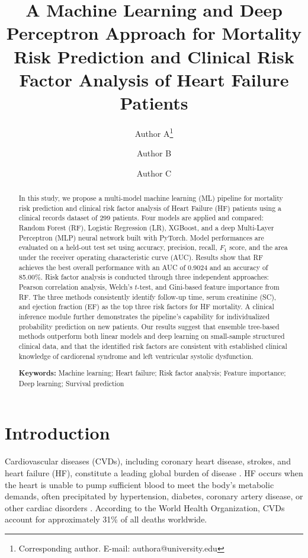 \documentclass[12pt,a4paper]{article}
\title{\textbf{A Machine Learning and Deep Perceptron Approach for Mortality Risk Prediction and Clinical Risk Factor Analysis of Heart Failure Patients}}
\author[1]{Author A\thanks{Corresponding author. E-mail: authora@university.edu}}
\author[1]{Author B}
\author[2]{Author C}
\affil[1]{Department of Computer Science, University A, City, Country}
\affil[2]{Department of Cardiology, University B, City, Country}
\date{}
\begin{document}
\maketitle

\begin{abstract}
\noindent
In this study, we propose a multi-model machine learning (ML) pipeline for mortality risk prediction and clinical risk factor analysis of Heart Failure (HF) patients using a clinical records dataset of 299 patients. Four models are applied and compared: Random Forest (RF), Logistic Regression (LR), XGBoost, and a deep Multi-Layer Perceptron (MLP) neural network built with PyTorch. Model performances are evaluated on a held-out test set using accuracy, precision, recall, $F_1$ score, and the area under the receiver operating characteristic curve (AUC). Results show that RF achieves the best overall performance with an AUC of 0.9024 and an accuracy of 85.00\%. Risk factor analysis is conducted through three independent approaches: Pearson correlation analysis, Welch's $t$-test, and Gini-based feature importance from RF. The three methods consistently identify follow-up time, serum creatinine (SC), and ejection fraction (EF) as the top three risk factors for HF mortality. A clinical inference module further demonstrates the pipeline's capability for individualized probability prediction on new patients. Our results suggest that ensemble tree-based methods outperform both linear models and deep learning on small-sample structured clinical data, and that the identified risk factors are consistent with established clinical knowledge of cardiorenal syndrome and left ventricular systolic dysfunction.

\vspace{0.5em}
\noindent\textbf{Keywords:} Machine learning; Heart failure; Risk factor analysis; Feature importance; Deep learning; Survival prediction
\end{abstract}

\section{Introduction}
\label{sec:intro}

Cardiovascular diseases (CVDs), including coronary heart disease, strokes, and heart failure (HF), constitute a leading global burden of disease \citep{chicco2020ml}. HF occurs when the heart is unable to pump sufficient blood to meet the body's metabolic demands, often precipitated by hypertension, diabetes, coronary artery disease, or other cardiac disorders \citep{ali2023ml}. According to the World Health Organization, CVDs account for approximately 31\% of all deaths worldwide.
\end{document}
